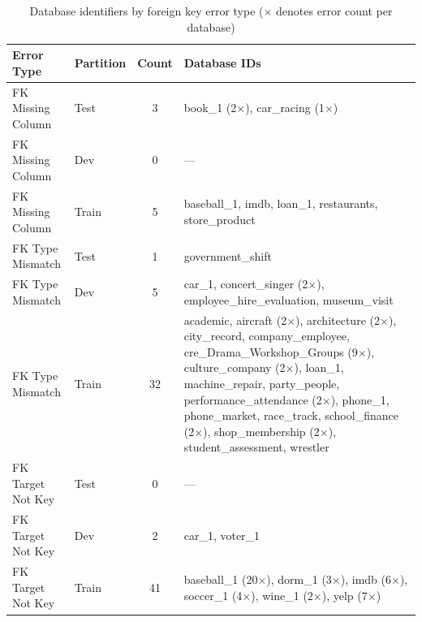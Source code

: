 \documentclass[print]{einformatica}
\begin{document}
\begin{table}[H]
    \caption{Database identifiers by foreign key error type ($\times$ denotes error count per database)}
    \label{tab:schema_dbs_by_error}
    \centering
    \footnotesize
    \begin{tabular}{llcp{}}
        \toprule
        \textbf{Error Type} & \textbf{Partition} & \textbf{Count} & \textbf{Database IDs} \\
        \midrule
        FK Missing Column & Test & 3 & book\_1 (2$\times$), car\_racing (1$\times$) \\
        FK Missing Column & Dev & 0 & --- \\
        FK Missing Column & Train & 5 & baseball\_1, imdb, loan\_1, restaurants, store\_product \\
        \midrule
        FK Type Mismatch & Test & 1 & government\_shift \\
        FK Type Mismatch & Dev & 5 & car\_1, concert\_singer (2$\times$), employee\_hire\_evaluation, museum\_visit \\
        FK Type Mismatch & Train & 32 & academic, aircraft (2$\times$), architecture (2$\times$), city\_record, company\_employee, cre\_Drama\_Workshop\_Groups (9$\times$), culture\_company (2$\times$), loan\_1, machine\_repair, party\_people, performance\_attendance (2$\times$), phone\_1, phone\_market, race\_track, school\_finance (2$\times$), shop\_membership (2$\times$), student\_assessment, wrestler \\
        \midrule
        FK Target Not Key & Test & 0 & --- \\
        FK Target Not Key & Dev & 2 & car\_1, voter\_1 \\
        FK Target Not Key & Train & 41 & baseball\_1 (20$\times$), dorm\_1 (3$\times$), imdb (6$\times$), soccer\_1 (4$\times$), wine\_1 (2$\times$), yelp (7$\times$) \\
        \bottomrule
    \end{tabular}
\end{table}
\end{document}

